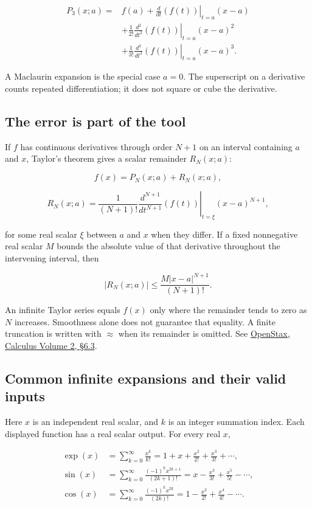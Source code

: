 \documentclass[11pt,oneside,openany]{book}
\begin{document}
\[
\begin{aligned}
P_3(x;a)={}&f(a)
+\left.\frac{d}{dt}\left(f(t)\right)\right|_{t=a}(x-a)\\
&+\frac1{2!}\left.\frac{d^2}{dt^2}\left(f(t)\right)\right|_{t=a}(x-a)^2\\
&+\frac1{3!}\left.\frac{d^3}{dt^3}\left(f(t)\right)\right|_{t=a}(x-a)^3.
\end{aligned}
\]

A Maclaurin expansion is the special case \(a=0\). The superscript on a derivative
counts repeated differentiation; it does not square or cube the derivative.

\subsection{The error is part of the tool}

If \(f\) has continuous derivatives through order \(N+1\) on an interval containing
\(a\) and \(x\), Taylor's theorem gives a scalar remainder \(R_N(x;a)\):

\[
f(x)=P_N(x;a)+R_N(x;a),
\]

\[
R_N(x;a)=\frac1{(N+1)!}
\left.\frac{d^{N+1}}{dt^{N+1}}\left(f(t)\right)\right|_{t=\xi}
(x-a)^{N+1},
\]

for some real scalar \(\xi\) between \(a\) and \(x\) when they differ. If a fixed
nonnegative real scalar \(M\) bounds the absolute value of that derivative
throughout the intervening interval, then

\[
|R_N(x;a)|\leq\frac{M|x-a|^{N+1}}{(N+1)!}.
\]

An infinite Taylor series equals \(f(x)\) only where the remainder tends to zero
as \(N\) increases. Smoothness alone does not guarantee that equality. A finite truncation is written with \(\approx\) when its remainder is omitted.
See \href{https://openstax.org/books/calculus-volume-2/pages/6-3-taylor-and-maclaurin-series}{OpenStax, Calculus Volume 2, §6.3}.

\subsection{Common infinite expansions and their valid inputs}

Here \(x\) is an independent real scalar, and \(k\) is an integer summation index.
Each displayed function has a real scalar output. For every real \(x\),

\[
\begin{aligned}
\exp(x)&=\sum_{k=0}^{\infty}\frac{x^k}{k!}
=1+x+\frac{x^2}{2!}+\frac{x^3}{3!}+\cdots,\\
\sin(x)&=\sum_{k=0}^{\infty}\frac{(-1)^k x^{2k+1}}{(2k+1)!}
=x-\frac{x^3}{3!}+\frac{x^5}{5!}-\cdots,\\
\cos(x)&=\sum_{k=0}^{\infty}\frac{(-1)^k x^{2k}}{(2k)!}
=1-\frac{x^2}{2!}+\frac{x^4}{4!}-\cdots.
\end{aligned}
\]
\end{document}
